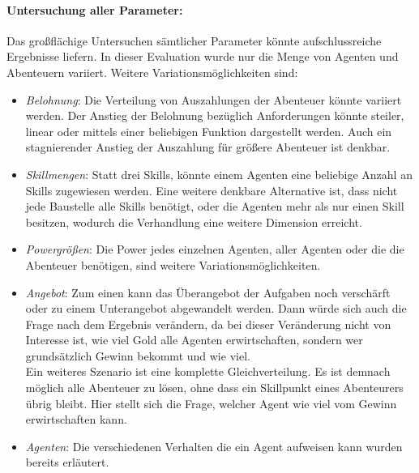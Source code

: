 \documentclass[fleqn,10pt]{SelfArx} %
\begin{document}
\paragraph{Untersuchung aller Parameter:}
Das großflächige Untersuchen sämtlicher Parameter könnte aufschlussreiche Ergebnisse liefern. In dieser Evaluation wurde nur die Menge von Agenten und Abenteuern variiert. Weitere Variationsmöglichkeiten sind:
\begin{itemize}
	\item \textit{Belohnung}: Die Verteilung von Auszahlungen der Abenteuer könnte variiert werden. Der Anstieg der Belohnung bezüglich Anforderungen könnte steiler, linear oder mittels einer beliebigen Funktion dargestellt werden. Auch ein stagnierender Anstieg der Auszahlung für größere Abenteuer ist denkbar.
	\item \textit{Skillmengen}: Statt drei Skills, könnte einem Agenten eine beliebige Anzahl an Skills zugewiesen werden. Eine weitere denkbare Alternative ist, dass nicht jede Baustelle alle Skills benötigt, oder die Agenten mehr als nur einen Skill besitzen, wodurch die Verhandlung eine weitere Dimension erreicht. 
	\item \textit{Powergrößen}: Die Power jedes einzelnen Agenten, aller Agenten oder die die Abenteuer benötigen, sind weitere Variationsmöglichkeiten.
	\item \textit{Angebot}: Zum einen kann das Überangebot der Aufgaben noch verschärft oder zu einem Unterangebot abgewandelt werden. Dann würde sich auch die Frage nach dem Ergebnis verändern, da bei dieser Veränderung nicht von Interesse ist, wie viel Gold alle Agenten erwirtschaften, sondern wer grundsätzlich Gewinn bekommt und wie viel. \\
	Ein weiteres Szenario ist eine komplette Gleichverteilung. Es ist demnach möglich alle Abenteuer zu lösen, ohne dass ein Skillpunkt eines Abenteurers übrig bleibt. Hier stellt sich die Frage, welcher Agent wie viel vom Gewinn erwirtschaften kann.
	\item \textit{Agenten}: Die verschiedenen Verhalten die ein Agent aufweisen kann wurden bereits erläutert.
\end{itemize}
\end{document}
